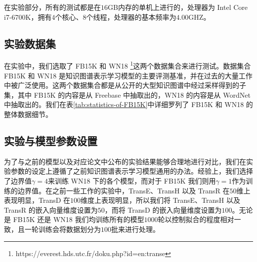 在实验部分，所有的测试都是在$16$GB内存的单机上进行的，处理器为 Intel Core i7-6700K，拥有$4$个核心、$8$个线程，处理器的基本频率为$4.00$GHZ。

\subsection{实验数据集}

在实验中，我们选取了 FB15K 和 WN18 \footnote{https://everest.hds.utc.fr/doku.php?id=en:transe}这两个数据集合来进行测试。数据集合 FB15K 和 WN18 是知识图谱表示学习模型的主要评测基准，并在过去的大量工作中被广泛使用。这两个数据集合都是从公开的大型知识图谱中经过采样得到的子集，其中 FB15K 的内容是从 Freebase 中抽取出的，WN18 的内容是从 WordNet 中抽取出的。我们在表\ref{tab:statistics-of-FB15K}中详细罗列了 FB15K 和 WN18 的整体数据细节。

\begin{table}[htb]
\centering
\caption{FB15K 和 WN18 的数据细节}
\label{tab:statistics-of-FB15K}
\end{table}

\subsection{实验与模型参数设置}
为了与之前的模型以及对应论文中公布的实验结果能够合理地进行对比，我们在实验参数的设定上遵循了之前知识图谱表示学习模型通用的办法。经验上，我们选择了边界值$\gamma = 4$来训练 WN18 下的各个模型，而对于 FB15K 我们则用$\gamma = 1$作为训练的边界值。在之前一些工作的实验中，TransE、TransH 以及 TransR 在$50$维上表现明显，TransD 在$100$维度上表现明显，所以我们将 TransE、TransH 以及 TransR 的嵌入向量维度设置为$50$，而将 TransD 的嵌入向量维度设置为$100$。无论是 FB15K 还是 WN18 我们均训练所有的模型$1000$轮以控制拟合的程度相对一致，且一轮训练会将数据划分为$100$批来进行处理。


